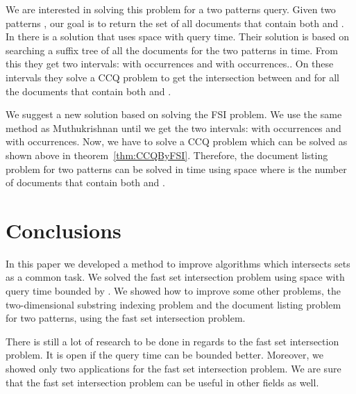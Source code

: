 \documentclass[10pt]{llncs}
\begin{document}
We are interested in solving this problem for a two patterns query.
Given two patterns ,
our goal is to return the set of all documents that contain both  and .
In \cite{Muthu02} there is a solution that uses  space with  query time.
Their solution is based on searching a suffix tree of all the documents
for the two patterns  in  time.
From this they get two intervals:
 with  occurrences and  with  occurrences..
On these intervals they solve a CCQ problem to get the intersection
between  and  for all the documents that contain both  and .

We suggest a new solution based on solving the FSI problem.
We use the same method as Muthukrishnan \cite{Muthu02}
until we get the two intervals:
 with  occurrences and  with  occurrences.
Now, we have to solve a CCQ problem which can be solved as shown above in theorem~\ref{thm:CCQByFSI}.
Therefore, the document listing problem for two patterns can be solved
in  time using  space
where  is the number of documents that contain both  and .


\section{Conclusions}\label{sec:Conclusions}
In this paper we developed a method to improve algorithms which intersects sets as a common task.
We solved the fast set intersection problem
using  space with query time bounded by .
We showed how to improve some other problems,
the two-dimensional substring indexing problem and the document listing problem for two patterns,
using the fast set intersection problem.

There is still a lot of research to be done in regards to the fast set intersection problem.
It is open if the query time can be bounded better.
Moreover, we showed only two applications for the fast set intersection problem.
We are sure that the fast set intersection problem can be useful in other fields as well.




\end{document}
